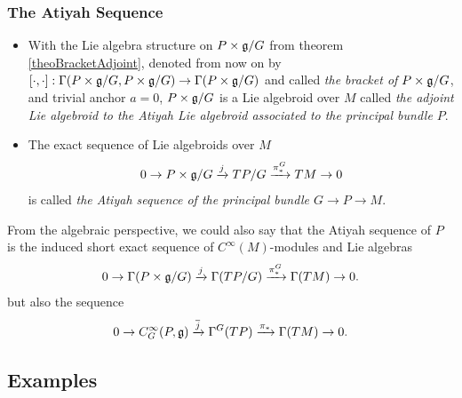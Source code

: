 \subsubsection{The Atiyah Sequence}
\begin{definition}\label{definitionAtiyahSequencePrincipalBundleVectorBundle}
\hfill
    \begin{itemize}
    
    \item With the Lie algebra structure on $P \times \mathfrak{g}/G$ from theorem \ref{theoBracketAdjoint}, denoted from now on by $[\cdot, \cdot]: \Gamma(P \times \mathfrak{g}/G, P \times \mathfrak{g}/G) \to \Gamma(P \times \mathfrak{g}/G)$ and called \emph{the bracket of $P \times \mathfrak{g}/G$}, and trivial anchor $a=0$, $P \times \mathfrak{g}/G$ is a Lie algebroid over $M$ called \emph{the adjoint Lie algebroid to the Atiyah Lie algebroid associated to the principal bundle $P$}. 
    
    \item The exact sequence of Lie algebroids over $M$
\begin{align} \label{definitionAtiyahSequencePrincipalBundleVectorBundleuence}
    0 \to P \times \mathfrak{g}/G \xrightarrow{j} TP/G \xrightarrow{\pi_*^G} TM \to 0
\end{align}
is called \emph{the Atiyah sequence of the principal bundle $G \to P \to M$}.
    \end{itemize}

From the algebraic perspective, we could also say that the Atiyah sequence of $P$ is the induced short exact sequence of $C^\infty(M)$-modules and Lie algebras
\begin{align} \label{equationdefinitionAtiyahSequencePrincipalBundleVectorBundleuencePrincipalBundleSectionsSequence}
    0 \to \Gamma(P \times \mathfrak{g}/G) \xrightarrow{j} \Gamma(TP/G) \xrightarrow{\pi^G_*} \Gamma(TM) \to 0.
\end{align}
but also the sequence
\begin{align} \label{equationdefinitionAtiyahSequencePrincipalBundleVectorBundleuencePrincipalBundleSectionsSequenceGInvariant}
    0 \to C^\infty_G(P, \mathfrak{g}) \xrightarrow{\overline{j}} \Gamma^G(TP) \xrightarrow{\pi_*} \Gamma(TM) \to 0.
\end{align}

\end{definition}

\subsection{Examples}

